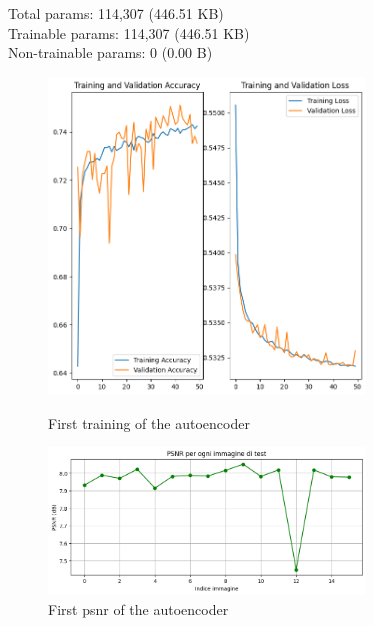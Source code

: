 \documentclass[12pt,a4paper,openright,twoside]{book}
\begin{document}
 Total params: 114,307 (446.51 KB)\\
 Trainable params: 114,307 (446.51 KB)\\
 Non-trainable params: 0 (0.00 B)\\
\begin{figure}
  \centering
  \includegraphics[width=0.75\textwidth]{autoencoder_train_1}
  \caption{First training of the autoencoder}
  \includegraphics[width=0.75\textwidth]{autoencoder_psnr_1}
  \caption{First psnr of the autoencoder}
  \label{fig:auto_train_1}
\end{figure}
\end{document}
